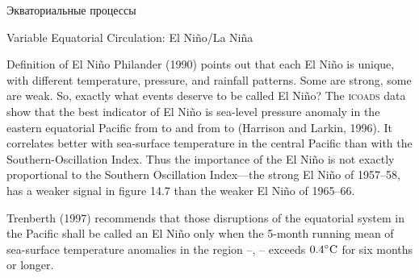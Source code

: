\begin{chapter}{Экваториальные процессы}
\begin{section}{Variable Equatorial Circulation: El Ni\~{n}o/La Ni\~{n}a}
\begin{paragraph}{Definition of El Ni\~{n}o}
Philander (1990) points out that each El
Ni\~{n}o is unique, with different temperature, pressure, and
rainfall patterns. Some are strong, some are
weak. So, exactly what events deserve to be called El Ni\~{n}o? The
\textsc{icoads} data show that the best indicator of El
Ni\~{n}o is sea-level pressure anomaly in the eastern equatorial
Pacific from  to  and from  to
 (Harrison and Larkin, 1996). It correlates better with
sea-surface temperature in the central Pacific than with the
Southern-Oscillation Index. Thus the importance of the El Ni\~{n}o is
not exactly proportional to the Southern Oscillation
Index---the strong El Ni\~{n}o of
1957--58, has a weaker signal in figure 14.7 than the weaker El
Ni\~{n}o of 1965--66.
%

Trenberth (1997) recommends that those disruptions of the equatorial
system in the Pacific shall be called an El Ni\~{n}o only when the
5-month running mean of sea-surface temperature
anomalies in the region
--, -- exceeds
${0.4}^\circ\mbox{C}$ for six months or longer.
%


\end{paragraph}
\end{section}
\end{chapter}
